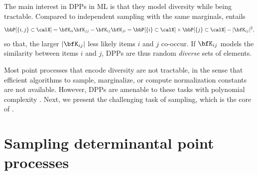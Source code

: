 \documentclass[twoside,11pt]{article}
\begin{document}
        The main interest in DPPs in ML is that they model diversity while being tractable.
        Compared to independent sampling with the same marginals,  entails
        \begin{equation*}
        \label{eq:2point_correlation_function_inclusion_proba_finite_case}
          \Proba{\{i,j\} \subset \calX}
            = {\bfK}_{ii}{\bfK}_{jj}-{\bfK}_{ij}{\bfK}_{ji}
            = \Proba{\{i\} \subset \calX}
              \times \Proba{\{j\} \subset \calX}
                - |{\bfK}_{ij}|^2,
        \end{equation*}
        so that, the larger $\lrabs{\bfK_{ij}}$ less likely items $i$ and $j$ co-occur.
        If $\bfK_{ij}$ models the similarity between items $i$ and $j$, DPPs are thus random \emph{diverse} sets of elements.

        Most point processes that encode diversity are not tractable, in the sense that efficient algorithms to sample, marginalize, or compute normalization constants are not available.
        However, DPPs are amenable to these tasks with polynomial complexity \citep{Gil14}.
        Next, we present the challenging task of sampling, which is the core of \DPPy.


    \section{Sampling determinantal point processes} %
    \label{sec:sampling}
\end{document}
